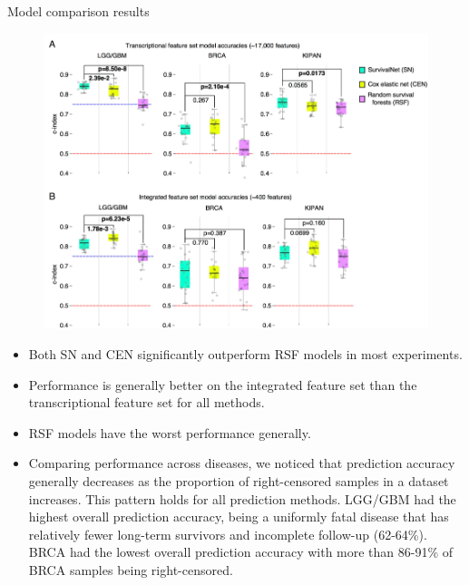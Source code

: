 \documentclass[
]{beamer}
\begin{document}
	
	\begin{frame}{Model comparison results}
		\begin{figure}
			\includegraphics[scale=0.4]{res1}
		\end{figure}
	\end{frame}
	
	\begin{frame}
		\begin{itemize}
			\item Both SN and CEN significantly outperform RSF models in most experiments.
			\item Performance is generally better on the integrated feature set than the transcriptional feature set for all methods.
			\item RSF models have the
			worst performance generally.
			\item Comparing performance across diseases,
			we noticed that prediction accuracy generally decreases as the proportion of right-censored samples in a dataset
			increases. This pattern holds for all prediction methods. LGG/GBM had the highest overall prediction accuracy,
			being a uniformly fatal disease that has relatively fewer long-term survivors and incomplete follow-up (62-64\%).
			BRCA had the lowest overall prediction accuracy with more than 86-91\% of BRCA samples being
			right-censored.
		\end{itemize}
	\end{frame}
	
\end{document}
